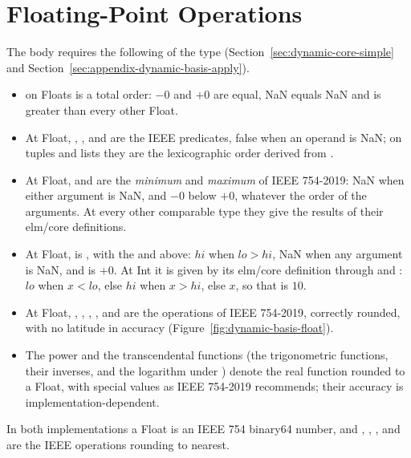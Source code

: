 \section{Floating-Point Operations}\label{sec:appendix-implementation-float}

The body requires the following of the type 
(Section~\ref{sec:dynamic-core-simple} and
Section~\ref{sec:appendix-dynamic-basis-apply}).
\begin{itemize}
\item {} on Floats is a total order: $-0$ and $+0$ are equal, NaN
  equals NaN and is greater than every other Float. %
\item At Float, \kw{<}, \kw{<=}, \kw{>} and \kw{>=} are the IEEE predicates,
  false when an operand is NaN; on tuples and lists they are the
  lexicographic order derived from . %
\item At Float,  and  are the \emph{minimum} and
  \emph{maximum} of IEEE 754-2019: NaN when either argument is NaN, and
  $-0$ below $+0$, whatever the order of the arguments. At every other
  comparable type they give the results of their elm/core definitions. %
\item At Float,  is , with the
   and  above: $hi$ when $lo>hi$, NaN when any argument is
  NaN, and  is $+0$. At Int it is given by its elm/core
  definition through \kw{<} and \kw{>}: $lo$ when $x<lo$, else $hi$ when
  $x>hi$, else $x$, so that  is $10$. %
\item At Float, \kw{+}, \kw{-}, \kw{*}, \kw{/},  and 
  are the operations of IEEE 754-2019, correctly rounded, with no latitude
  in accuracy (Figure~\ref{fig:dynamic-basis-float}).
\item The power and the transcendental functions (the trigonometric functions,
  their inverses,  and the logarithm under ) denote the
  real function rounded to a Float, with special values as IEEE 754-2019
  recommends; their accuracy is implementation-dependent. %
\end{itemize}
In both implementations a Float is an IEEE 754 binary64 number, and \kw{+},
\kw{-}, \kw{*}, \kw{/} and  are the IEEE operations rounding to
nearest.

